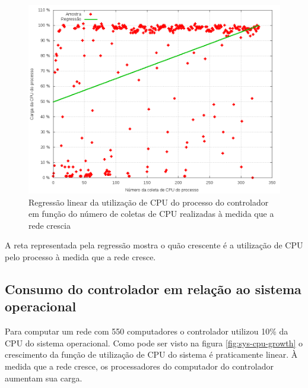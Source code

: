 \begin{figure}[!htb]
    \centering
    \label{fig:scatter-usr-cpu}
    \includegraphics[width=\linewidth]{img/scatter-usr-cpu}
    \caption{Regressão linear da utilização de CPU do processo do controlador
    em função do número de coletas de CPU realizadas à medida que a rede 
    crescia}
\end{figure}

A reta representada pela regressão mostra o quão crescente é a utilização de 
CPU pelo processo à medida que a rede cresce.


\subsection{Consumo do controlador em relação ao sistema operacional}

Para computar um rede com 550 computadores o controlador utilizou 10\% da 
CPU do sistema operacional.
Como pode ser visto na figura \ref{fig:sys-cpu-growth} o crescimento da 
função de utilização de CPU do sistema é praticamente linear.
À medida que a rede cresce, os processadores do computador do controlador 
aumentam sua carga.

